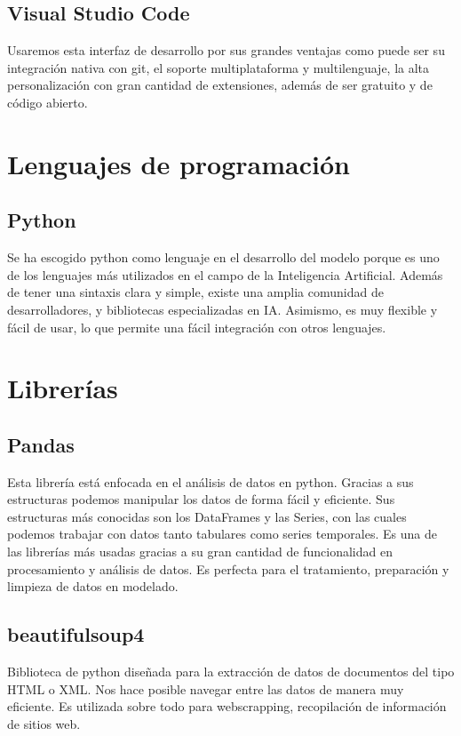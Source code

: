 \subsection{Visual Studio Code}
Usaremos esta interfaz de desarrollo por sus grandes ventajas como puede ser su integración nativa con git, el soporte multiplataforma y multilenguaje, la alta personalización con gran cantidad de extensiones, además de ser gratuito y de código abierto.

\section{Lenguajes de programación}

\subsection{Python}
Se ha escogido python como lenguaje en el desarrollo del modelo porque es uno de los lenguajes más utilizados en el campo de la Inteligencia Artificial. Además de tener una sintaxis clara y simple, existe una amplia comunidad de desarrolladores, y bibliotecas especializadas en IA. Asimismo, es muy flexible y fácil de usar, lo que permite una fácil integración con otros lenguajes.

\section{Librerías}

\subsection{Pandas}
Esta librería está enfocada en el análisis de datos en python. Gracias a sus estructuras podemos manipular los datos de forma fácil y eficiente. Sus estructuras más conocidas son los DataFrames y las Series, con las cuales podemos trabajar con datos tanto tabulares como series temporales. Es una de las librerías más usadas gracias a su gran cantidad de funcionalidad en procesamiento y análisis de datos. Es perfecta para el tratamiento, preparación y limpieza de datos en modelado.

\subsection{beautifulsoup4}
Biblioteca de python diseñada para la extracción de datos de documentos del tipo HTML o XML. Nos hace posible navegar entre las datos de manera muy eficiente. Es utilizada sobre todo para webscrapping, recopilación de información de sitios web. 


